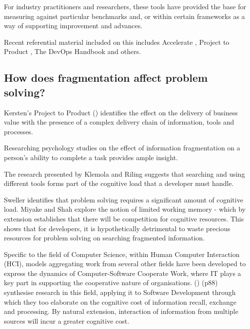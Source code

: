 For industry practitioners and researchers, these tools have provided the base for measuring against particular benchmarks and, or within certain frameworks as a way of supporting improvement and advances. 

Recent referential material included on this includes Accelerate \parencite{humble2018accelerate}, Project to Product \parencite{kersten2018projecproduct}, The DevOps Handbook \parencite{kim2016devops} and others.

\subsection{How does fragmentation affect problem solving?}


Kersten's Project to Product () identifies the effect on the delivery of business value with the presence of a complex delivery chain of information, tools and processes. 


Researching psychology studies on the effect of information fragmentation on a person's ability to complete a task provides ample insight. 

The research presented by Klemola and Riling \parencite*{klemola2002modeling} suggests that searching and using different tools forms part of the cognitive load that a developer must handle.

Sweller \parencite*{sweller1998cognitive} identifies that problem solving requires a significant amount of cognitive load. Miyake and Shah \parencite*{miyake1999models} explore the notion of limited working memory - which by extension establishes that there will be competition for cognitive resources. This shows that for developers, it is hypothetically detrimental to waste precious resources for problem solving on searching fragmented information.

Specific to the field of Computer Science, within Human Computer Interaction (HCI), models aggregating work from several other fields have been developed to express the dynamics of Computer-Software Cooperate Work, where IT plays a key part in supporting the cooperative nature of organisations. \citeauthor{cscApplicationsToSoftwareDevelopment} () (p88) synthesise research in this field, applying it to Software Development through which they too elaborate on the cognitive cost of information recall, exchange and processing. By natural extension, interaction of information from multiple sources will incur a greater cognitive cost. 

